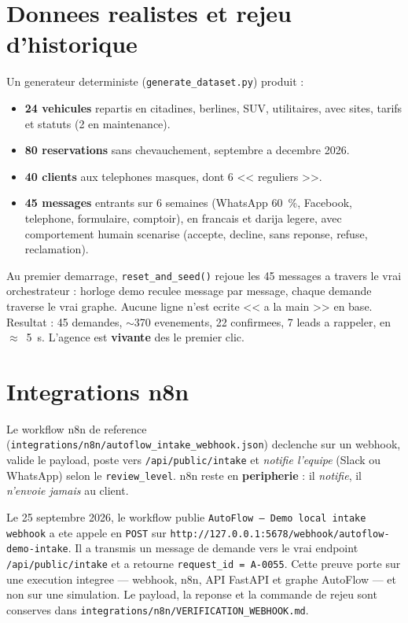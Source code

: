 \documentclass[12pt,a4paper,openany]{report}
\begin{document}
\section{Donnees realistes et rejeu d'historique}

Un generateur deterministe (\texttt{generate\_dataset.py}) produit :
\begin{itemize}[leftmargin=1.5cm]
\item \textbf{24 vehicules} repartis en citadines, berlines, SUV, utilitaires, avec sites, tarifs et statuts (2 en maintenance).
\item \textbf{80 reservations} sans chevauchement, septembre a decembre 2026.
\item \textbf{40 clients} aux telephones masques, dont 6 << reguliers >>.
\item \textbf{45 messages} entrants sur 6 semaines (WhatsApp 60~\%, Facebook, telephone, formulaire, comptoir), en francais et darija legere, avec comportement humain scenarise (accepte, decline, sans reponse, refuse, reclamation).
\end{itemize}

\begin{mechanismbox}
Au premier demarrage, \texttt{reset\_and\_seed()} rejoue les 45 messages a travers le vrai orchestrateur : horloge demo reculee message par message, chaque demande traverse le vrai graphe. Aucune ligne n'est ecrite << a la main >> en base. Resultat : 45 demandes, $\sim$370 evenements, 22 confirmees, 7 leads a rappeler, en $\approx$~5~s. L'agence est \textbf{vivante} des le premier clic.
\end{mechanismbox}

\section{Integrations n8n}

Le workflow n8n de reference (\texttt{integrations/n8n/autoflow\_intake\_webhook.json}) declenche sur un webhook, valide le payload, poste vers \texttt{/api/public/intake} et \emph{notifie l'equipe} (Slack ou WhatsApp) selon le \texttt{review\_level}. n8n reste en \textbf{peripherie} : il \emph{notifie}, il \emph{n'envoie jamais} au client.

\begin{mechanismbox}
Le 25 septembre 2026, le workflow publie \texttt{AutoFlow -- Demo local intake webhook} a ete appele en \texttt{POST} sur \texttt{http://127.0.0.1:5678/webhook/autoflow-demo-intake}. Il a transmis un message de demande vers le vrai endpoint \texttt{/api/public/intake} et a retourne \texttt{request\_id = A-0055}. Cette preuve porte sur une execution integree --- webhook, n8n, API FastAPI et graphe AutoFlow --- et non sur une simulation. Le payload, la reponse et la commande de rejeu sont conserves dans \texttt{integrations/n8n/VERIFICATION\_WEBHOOK.md}.
\end{mechanismbox}
\end{document}
